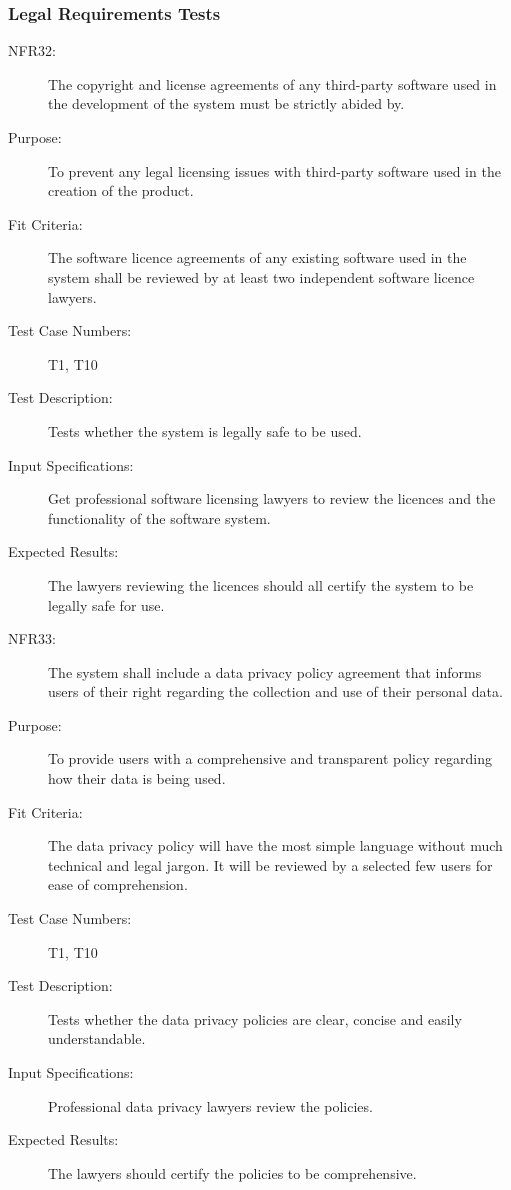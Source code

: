 \documentclass[a4paper,twoside,phd]{BYUPhys}
\begin{document}
\subsubsection{Legal Requirements Tests}
\begin{description}
\item[NFR32:] The copyright and license agreements of any third-party software used in the development of the system must be strictly abided by.
\item[Purpose:] To prevent any legal licensing issues with third-party software used in the creation of the product.
\item[Fit Criteria:] The software licence agreements of any existing software used in the system shall be reviewed by at least two independent software licence lawyers.
\item[Test Case Numbers:] T1, T10
\item[Test Description:] Tests whether the system is legally safe to be used.
\item[Input Specifications:] Get professional software licensing lawyers to review the licences and the functionality of the software system.
\item[Expected Results:] The lawyers reviewing the licences should all certify the system to be legally safe for use.

\item[NFR33:] The system shall include a data privacy policy agreement that informs users of their right regarding the collection and use of their personal data.
\item[Purpose:] To provide users with a comprehensive and transparent policy regarding how their data is being used.
\item[Fit Criteria:] The data privacy policy will have the most simple language without much technical and legal jargon. It will be reviewed by a selected few users for ease of comprehension.
\item[Test Case Numbers:] T1, T10
\item[Test Description:] Tests whether the data privacy policies are clear, concise and easily understandable.
\item[Input Specifications:] Professional data privacy lawyers review the policies.
\item[Expected Results:] The lawyers should certify the policies to be comprehensive.


\end{description}
\end{document}
